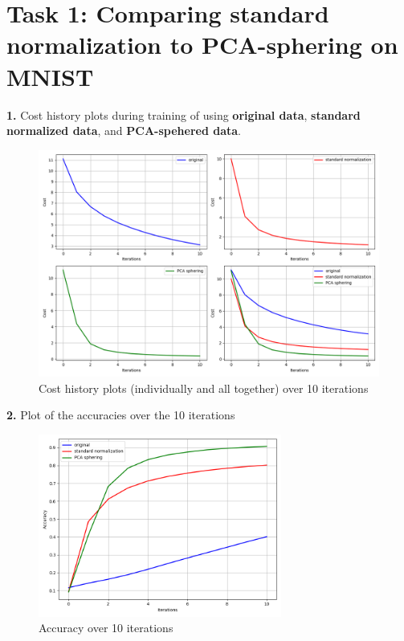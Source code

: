 \setlength\intextsep{1mm}

\section*{\textbf{Task 1: Comparing standard normalization to PCA-sphering on MNIST}}


\textbf{1.} Cost history plots during training of using \textbf{original data}, \textbf{standard normalized data}, and \textbf{PCA-spehered data}.

\begin{figure}[H]
    \centering
    \includegraphics[width=120mm]{task1-cost.png}
    \caption{Cost history plots (individually and all together) over 10 iterations}
    \label{fig:task1}
\end{figure}


\textbf{2.} Plot of the accuracies over the 10 iterations
\begin{figure}[H]
    \centering
    \includegraphics[width=80mm]{task1-accuracy.png}
    \caption{Accuracy over 10 iterations}
    \label{fig:task2}
\end{figure}

